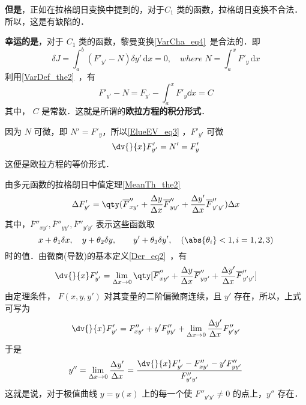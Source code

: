 \textbf{但是}，正如在拉格朗日变换中提到的，对于$C_1$ 类的函数，拉格朗日变换不合法．所以，这是有缺陷的．

\textbf{幸运的是}，对于 $C_1$ 类的函数，黎曼变换\autoref{VarCha_eq4}~是合法的．即
\begin{equation}
\delta J=\int_a^b \left(F'_{y'}-N \right) \delta y' \,\mathrm{d}{x}=0  ,\quad where \;N=\int_a^xF'_y \,\mathrm{d}{x} 
\end{equation}
利用\autoref{VarDef_the2}~，有
\begin{equation}\label{ElueEV_eq3}
F'_{y'}-N=F_{y'}-\int_a^xF'_y\dd x=C
\end{equation}
其中， $C$ 是常数．这就是所谓的\textbf{欧拉方程的积分形式}．

因为 $N$ 可微，即 $N'=F'_y$，所以\autoref{ElueEV_eq3} ，$F'_{y'}$ 可微
\begin{equation}
\dv{}{x}F'_{y'}=N'=F'_y
\end{equation}
这便是欧拉方程的等价形式．

由多元函数的拉格朗日中值定理\autoref{MeanTh_the2}~
\begin{equation}
\Delta F'_{y'}=\qty(\overline{F}''_{xy'}+\frac{\Delta y}{\Delta x}\overline{F}''_{yy'}+\frac{\Delta y'}{\Delta x}\overline{F}''_{y'y'})\Delta x
\end{equation}
其中，$\overline{F}''_{xy'},\overline{F}''_{yy'},\overline{F}''_{y'y'}$ 表示这些函数取
\begin{equation}
x+\theta_1\delta x,\quad y+\theta_2\delta y,\quad \quad y'+\theta_3\delta y',\quad (\abs{\theta_i}<1,i=1,2,3)
\end{equation}
时的值．由微商(导数)的基本定义\autoref{Der_eq2}~，有
\begin{equation}
\dv{}{x}F'_{y'}=\lim_{\Delta x\rightarrow 0}\qty[\overline{F}''_{xy'}+\frac{\Delta y}{\Delta x}\overline{F}''_{yy'}+\frac{\Delta y'}{\Delta x}\overline{F}''_{y'y'}]
\end{equation}
由定理条件， $F(x,y,y')$ 对其变量的二阶偏微商连续，且 $y'$ 存在，所以，上式可写为
\begin{equation}
\dv{}{x}F'_{y'}=F''_{xy'}+y'F''_{yy'}+\lim_{\Delta x\rightarrow0}\frac{\Delta y'}{\Delta x}F''_{y'y'}
\end{equation}
于是
\begin{equation}
y''=\lim_{\Delta x\rightarrow0}\frac{\Delta y'}{\Delta x}=\frac{\dv{}{x}F'_{y'}-F''_{xy'}-y'F''_{yy'}}{F''_{y'y'}}
\end{equation}
这就是说，对于极值曲线 $y=y(x)$ 上的每一个使 $F''_{y'y'}\neq0$ 的点上，$y''$ 存在．
